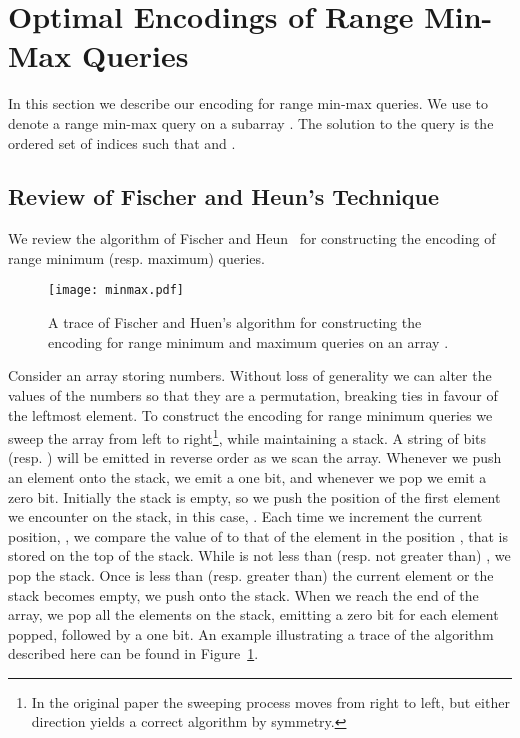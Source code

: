 \documentclass[runningheads]{llncs}
\begin{document}
\section{Optimal Encodings of Range Min-Max Queries\label{sec:min-max}}

In this section we describe our encoding for range min-max queries.
We use  to denote a range min-max query on a
subarray .  The solution to the query is the ordered set of
indices  such that  and .

\subsection{Review of Fischer and Heun's Technique}

We review the algorithm of Fischer and Heun~\cite{FH11} for
constructing the encoding of range minimum (resp. maximum) queries.


\begin{figure}
\centering
\texttt{[image: minmax.pdf]}
\caption{\label{fig:perm}A trace of Fischer and Huen's algorithm for
  constructing the encoding for range minimum and maximum queries on
  an array .}
\end{figure}


Consider an array  storing  numbers. Without loss of
generality we can alter the values of the numbers so that they are a
permutation, breaking ties in favour of the leftmost element. To
construct the encoding for range minimum queries we sweep the array
from left to right\footnote{In the original paper the sweeping process
  moves from right to left, but either direction yields a correct
  algorithm by symmetry.}, while maintaining a stack. A string of bits
 (resp. ) will be emitted in reverse order as we
scan the array.  Whenever we push an element onto the stack, we emit a
one bit, and whenever we pop we emit a zero bit. Initially the stack
is empty, so we push the position of the first element we encounter on
the stack, in this case, .  Each time we increment the current
position, , we compare the value of  to that of the element
in the position , that is stored on the top of the stack.  While
 is not less than (resp. not greater than) , we pop the
stack.  Once  is less than (resp. greater than) the current
element or the stack becomes empty, we push  onto the stack.  When
we reach the end of the array, we pop all the elements on the stack,
emitting a zero bit for each element popped, followed by a one bit.
An example illustrating a trace of the algorithm described here can be
found in Figure~\ref{fig:perm}.
\end{document}
